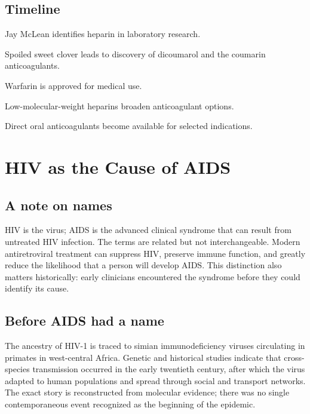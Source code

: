 \documentclass[12pt,oneside]{book}
\begin{document}
\section*{Timeline}
\begin{description}[leftmargin=2.3cm,style=nextline]
  \item[1916] Jay McLean identifies heparin in laboratory research.
  \item[1920s--1930s] Spoiled sweet clover leads to discovery of dicoumarol and the coumarin anticoagulants.
  \item[1954] Warfarin is approved for medical use.
  \item[Late twentieth century] Low-molecular-weight heparins broaden anticoagulant options.
  \item[Twenty-first century] Direct oral anticoagulants become available for selected indications.
\end{description}

\chapter[HIV as the Cause of AIDS]{HIV as the Cause of AIDS}

\section{A note on names}
HIV is the virus; AIDS is the advanced clinical syndrome that can result from
untreated HIV infection. The terms are related but not interchangeable. Modern
antiretroviral treatment can suppress HIV, preserve immune function, and greatly
reduce the likelihood that a person will develop AIDS. This distinction also
matters historically: early clinicians encountered the syndrome before they
could identify its cause.

\section{Before AIDS had a name}
The ancestry of HIV-1 is traced to simian immunodeficiency viruses circulating
in primates in west-central Africa. Genetic and historical studies indicate
that cross-species transmission occurred in the early twentieth century, after
which the virus adapted to human populations and spread through social and
transport networks. The exact story is reconstructed from molecular evidence;
there was no single contemporaneous event recognized as the beginning of the
epidemic.
\end{document}
